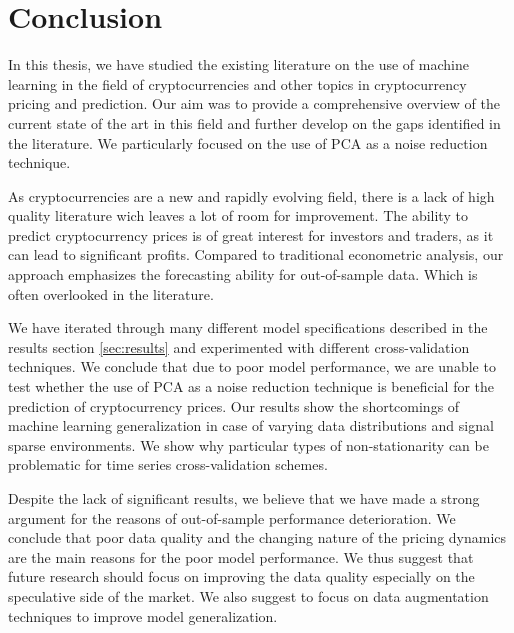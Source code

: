 \chapter{Conclusion}
\label{chap:six}

In this thesis,
we have studied the existing literature
on the use of machine learning in the field of cryptocurrencies
and other topics in cryptocurrency pricing and prediction.
Our aim was to provide a comprehensive overview of the current state
of the art in this field and further 
develop on the gaps identified in the literature.
We particularly focused on the use
of \ac{PCA} as a noise reduction technique. 

As cryptocurrencies are
a new and rapidly evolving field, there is a lack of
high quality literature wich leaves
a lot of room for improvement. 
The ability to predict cryptocurrency prices is of great interest
for investors and traders, as it can lead to significant profits.
Compared to traditional econometric analysis, 
our approach emphasizes the 
forecasting ability for out-of-sample data. Which 
is often overlooked in the literature.

We have iterated through many different model specifications 
described in the results section \ref{sec:results} and 
experimented with different cross-validation techniques.
We conclude that due to poor model performance,
we are unable to test whether the use of \ac{PCA} 
as a noise reduction
technique is beneficial for the prediction of cryptocurrency prices.
Our results show the shortcomings of
machine learning generalization in 
case of varying data distributions and
signal sparse environments.
We show why particular types of non-stationarity
can be problematic for time series cross-validation schemes.

Despite the lack of significant results,
we believe that we have made a 
strong argument 
for the reasons of 
out-of-sample performance deterioration.
We conclude that poor data quality
and the changing nature of the pricing dynamics 
are the main reasons for the poor model performance. We thus
suggest that future research should focus on improving the data quality
especially on the speculative side 
of the market.
We also suggest to focus on 
data augmentation techniques to improve
model generalization. 
